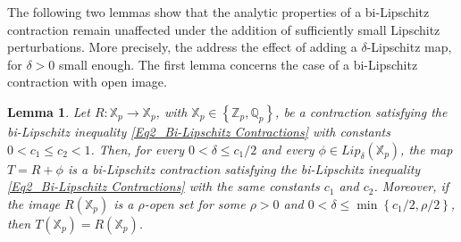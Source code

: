 \documentclass[a4paper, 12pt]{article}
\newtheorem{lemma}[theorem]{Lemma}
\theoremstyle{definition}
\begin{document}
	
	
	
	
	
	The following two lemmas show that the analytic properties of a bi-Lipschitz contraction remain unaffected under the addition of sufficiently small Lipschitz perturbations. More precisely, the address the effect of adding a $\delta$-Lipschitz map, for $\delta > 0$ small enough. The first lemma concerns the case of a bi-Lipschitz contraction with open image. 
	
	\begin{lemma}\label{Lem2_Open bi-Lipschitz Contraction plus Lipschitz}
		Let $R: \mathbb{X}_{p} \to \mathbb{X}_{p}$, with $\mathbb{X}_{p} \in  \left\{  \mathbb{Z}_{p}, \mathbb{Q}_{p}  \right\} $, be a contraction satisfying the bi-Lipschitz inequality \eqref{Eq2_Bi-Lipschitz Contractions} with constants $0  < c_{1} \le c_{2}  < 1$. 
		Then, for every $0  < \delta \le  c_{1}/2  $ and every $\phi \in Lip_{\delta} \left(  \mathbb{X}_{p}  \right) $, the map $T = R + \phi$ is a bi-Lipschitz contraction satisfying the bi-Lipschitz inequality \eqref{Eq2_Bi-Lipschitz Contractions} with the same constants $c_{1}$ and $c_{2}$. 
		Moreover, if the image $R \left(  \mathbb{X}_{p}  \right) $ is a $\rho$-open set for some $\rho  > 0$ and $0  < \delta \le \min \left\{  c_{1}/2,   \rho/2  \right\} $, then $ T \left(  \mathbb{X}_{p}  \right)  = R \left(  \mathbb{X}_{p}  \right) $.
	\end{lemma}
	
\end{document}
